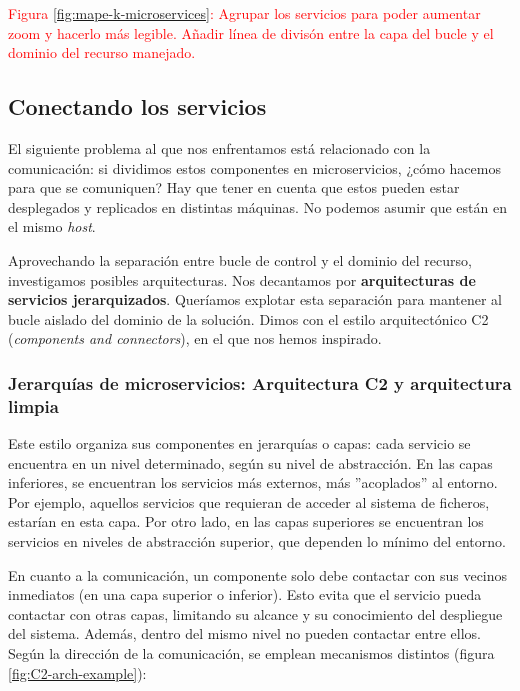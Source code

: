 \textcolor{red}{Figura \ref{fig:mape-k-microservices}: Agrupar los servicios para poder aumentar zoom y hacerlo más legible. Añadir línea de divisón entre la capa del bucle y el dominio del recurso manejado.}

\subsection{Conectando los servicios}

El siguiente problema al que nos enfrentamos está relacionado con la comunicación: si dividimos estos componentes en microservicios, ¿cómo hacemos para que se comuniquen? Hay que tener en cuenta que estos pueden estar desplegados y replicados en distintas máquinas. No podemos asumir que están en el mismo \emph{host}.

Aprovechando la separación entre bucle de control y el dominio del recurso, investigamos posibles arquitecturas. Nos decantamos por \textbf{arquitecturas de servicios jerarquizados}. Queríamos explotar esta separación para mantener al bucle aislado del dominio de la solución. Dimos con el estilo arquitectónico C2 (\emph {components and connectors})\cite{taylorComponentMessagebasedArchitectural1996a, UCISoftwareArchitecture}, en el que nos hemos inspirado.

\subsubsection{Jerarquías de microservicios: Arquitectura C2 y arquitectura limpia}

Este estilo organiza sus componentes en jerarquías o capas: cada servicio se encuentra en un nivel determinado, según su nivel de abstracción. En las capas inferiores, se encuentran los servicios más externos, más ''acoplados'' al entorno. Por ejemplo, aquellos servicios que requieran de acceder al sistema de ficheros, estarían en esta capa. Por otro lado, en las capas superiores se encuentran los servicios en niveles de abstracción superior, que dependen lo mínimo del entorno.

En cuanto a la comunicación, un componente solo debe contactar con sus vecinos inmediatos (en una capa superior o inferior). Esto evita que el servicio pueda contactar con otras capas, limitando su alcance y su conocimiento del despliegue del sistema. Además, dentro del mismo nivel no pueden contactar entre ellos. Según la dirección de la comunicación, se emplean mecanismos distintos (figura \ref{fig:C2-arch-example}):

